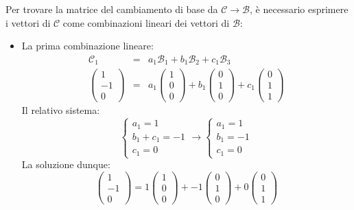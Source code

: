 \documentclass[a4paper]{article}
\begin{document}
	\noindent
	Per trovare la matrice del cambiamento di base da $\mathcal{C}\rightarrow \mathcal{B}$, è necessario esprimere i vettori di $\mathcal{C}$ come combinazioni lineari dei vettori di $\mathcal{B}$:
	\begin{itemize}
		\item La prima combinazione lineare:
		\begin{equation*}
			\begin{array}{rll}
				\mathcal{C}_{1} &=& a_{1}\mathcal{B}_{1} + b_{1}\mathcal{B}_{2} + c_{1}\mathcal{B}_{3} \\ [2em]
				\begin{pmatrix}
					1 \\ -1 \\ 0
				\end{pmatrix} &=& a_{1} \begin{pmatrix}
					1 \\ 0 \\ 0
				\end{pmatrix} + b_{1} \begin{pmatrix}
					0 \\ 1 \\ 0
				\end{pmatrix} + c_{1} \begin{pmatrix}
					0 \\ 1 \\ 1
				\end{pmatrix}
			\end{array}
		\end{equation*}
		Il relativo sistema:
		\begin{equation*}
			\begin{cases}
				a_{1} = 1 \\
				b_{1} + c_{1} = -1 \\
				c_{1} = 0
			\end{cases} \longrightarrow
			\begin{cases}
				a_{1} = 1 \\
				b_{1} = -1 \\
				c_{1} = 0
			\end{cases}
		\end{equation*}
		La soluzione dunque:
		\begin{equation*}
			\begin{pmatrix}
				1 \\ -1 \\ 0
			\end{pmatrix} = 1 \begin{pmatrix}
				1 \\ 0 \\ 0
			\end{pmatrix} + -1 \begin{pmatrix}
				0 \\ 1 \\ 0
			\end{pmatrix} + 0 \begin{pmatrix}
				0 \\ 1 \\ 1
			\end{pmatrix}
		\end{equation*}\newpage


\end{itemize}
\end{document}
